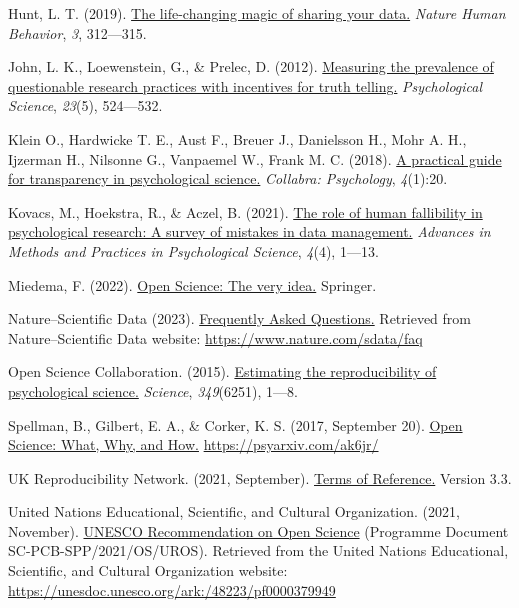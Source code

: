 \documentclass[
]{book}
\theoremstyle{definition}
\theoremstyle{definition}
\theoremstyle{definition}
\theoremstyle{definition}
\theoremstyle{remark}
\begin{document}
Hunt, L. T. (2019). \href{https://doi.org/10.1038/s41562-019-0560-3}{The life-changing magic of sharing your data.} \emph{Nature Human Behavior}, \emph{3}, 312---315.

John, L. K., Loewenstein, G., \& Prelec, D. (2012). \href{https://www.cmu.edu/dietrich/sds/docs/loewenstein/MeasPrevalQuestTruthTelling.pdf}{Measuring the prevalence of questionable research practices with incentives for truth telling.} \emph{Psychological Science}, \emph{23}(5), 524---532.

Klein O., Hardwicke T. E., Aust F., Breuer J., Danielsson H., Mohr A. H., Ijzerman H., Nilsonne G., Vanpaemel W., Frank M. C. (2018). \href{https://online.ucpress.edu/collabra/article/4/1/20/112998/A-Practical-Guide-for-Transparency-in}{A practical guide for transparency in psychological science.} \emph{Collabra: Psychology}, \emph{4}(1):20.

Kovacs, M., Hoekstra, R., \& Aczel, B. (2021). \href{https://journals.sagepub.com/doi/full/10.1177/25152459211045930}{The role of human fallibility in psychological research: A survey of mistakes in data management.} \emph{Advances in Methods and Practices in Psychological Science}, \emph{4}(4), 1---13.

Miedema, F. (2022). \href{https://library.oapen.org/handle/20.500.12657/51498}{Open Science: The very idea.} Springer.

Nature--Scientific Data (2023). \href{https://www.nature.com/sdata/faq}{Frequently Asked Questions.} Retrieved from Nature--Scientific Data website: \url{https://www.nature.com/sdata/faq}

Open Science Collaboration. (2015). \href{https://www.science.org/doi/10.1126/science.aac4716}{Estimating the reproducibility of psychological science.} \emph{Science}, \emph{349}(6251), 1---8.

Spellman, B., Gilbert, E. A., \& Corker, K. S. (2017, September 20). \href{https://psyarxiv.com/ak6jr/}{Open Science: What, Why, and How.} \url{https://psyarxiv.com/ak6jr/}

UK Reproducibility Network. (2021, September). \href{https://bpb-eu-w2.wpmucdn.com/blogs.bristol.ac.uk/dist/b/631/files/2021/09/UKRN-ToR-v3.3.pdf}{Terms of Reference.} Version 3.3.

United Nations Educational, Scientific, and Cultural Organization. (2021, November). \href{https://www.unesco.org/en/open-science}{UNESCO Recommendation on Open Science} (Programme Document SC-PCB-SPP/2021/OS/UROS). Retrieved from the United Nations Educational, Scientific, and Cultural Organization website: \url{https://unesdoc.unesco.org/ark:/48223/pf0000379949}
\end{document}

